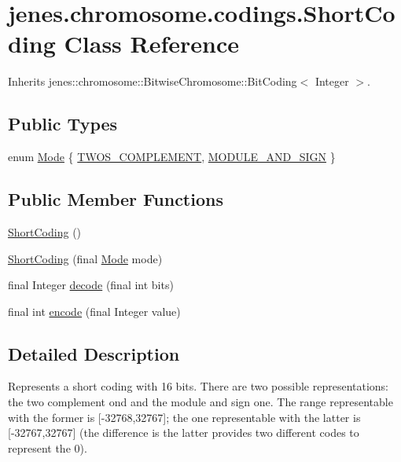 \hypertarget{classjenes_1_1chromosome_1_1codings_1_1_short_coding}{
\section{jenes.chromosome.codings.ShortCoding Class Reference}
\label{classjenes_1_1chromosome_1_1codings_1_1_short_coding}
}
Inherits jenes::chromosome::BitwiseChromosome::BitCoding$<$ Integer $>$.

\subsection*{Public Types}
\begin{CompactItemize}
\item 
enum \hyperlink{classjenes_1_1chromosome_1_1codings_1_1_short_coding_a38532b0120f3d7d1a77538e16ca7e5f}{Mode} \{ \hyperlink{_short_coding_8java_a38532b0120f3d7d1a77538e16ca7e5f9aa2a35d92976c7de970506c4d19a96c}{TWOS\_\-COMPLEMENT}, 
\hyperlink{_short_coding_8java_a38532b0120f3d7d1a77538e16ca7e5f845e770ff5a6ad45139e1c004222d8f4}{MODULE\_\-AND\_\-SIGN}
 \}
\end{CompactItemize}
\subsection*{Public Member Functions}
\begin{CompactItemize}
\item 
\hyperlink{classjenes_1_1chromosome_1_1codings_1_1_short_coding_0571cd23357dd77c1525ed09a5c28e61}{ShortCoding} ()
\item 
\hyperlink{classjenes_1_1chromosome_1_1codings_1_1_short_coding_6b6608f22e850e062f424033fae5e0bd}{ShortCoding} (final \hyperlink{classjenes_1_1chromosome_1_1codings_1_1_short_coding_a38532b0120f3d7d1a77538e16ca7e5f}{Mode} mode)
\item 
final Integer \hyperlink{classjenes_1_1chromosome_1_1codings_1_1_short_coding_a6c8649fe7e82bf923979d4afdfc9130}{decode} (final int bits)
\item 
final int \hyperlink{classjenes_1_1chromosome_1_1codings_1_1_short_coding_140298d12b6d6a291b5849b9cc5b7400}{encode} (final Integer value)
\end{CompactItemize}


\subsection{Detailed Description}
Represents a short coding with 16 bits. There are two possible representations: the two complement ond and the module and sign one. The range representable with the former is \mbox{[}-32768,32767\mbox{]}; the one representable with the latter is \mbox{[}-32767,32767\mbox{]} (the difference is the latter provides two different codes to represent the 0).

